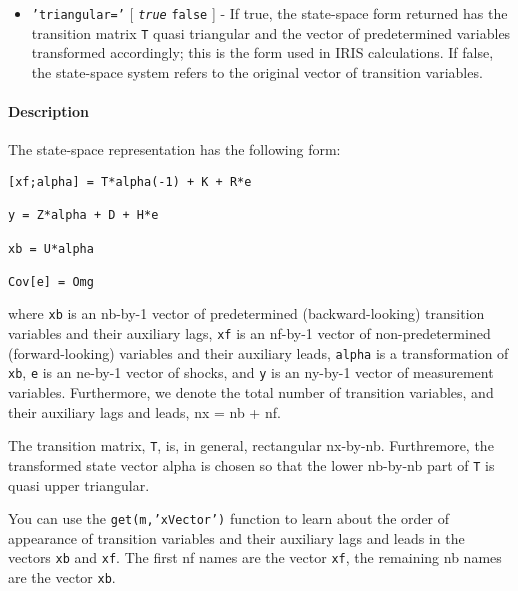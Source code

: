 \begin{itemize}
\itemsep1pt\parskip0pt
\item
  \texttt{'triangular='} {[} \emph{\texttt{true}} \textbar{}
  \texttt{false} {]} - If true, the state-space form returned has the
  transition matrix \texttt{T} quasi triangular and the vector of
  predetermined variables transformed accordingly; this is the form used
  in IRIS calculations. If false, the state-space system refers to the
  original vector of transition variables.
\end{itemize}

\paragraph{Description}\label{description}

The state-space representation has the following form:

\begin{verbatim}
[xf;alpha] = T*alpha(-1) + K + R*e

y = Z*alpha + D + H*e

xb = U*alpha

Cov[e] = Omg
\end{verbatim}

where \texttt{xb} is an nb-by-1 vector of predetermined
(backward-looking) transition variables and their auxiliary lags,
\texttt{xf} is an nf-by-1 vector of non-predetermined (forward-looking)
variables and their auxiliary leads, \texttt{alpha} is a transformation
of \texttt{xb}, \texttt{e} is an ne-by-1 vector of shocks, and
\texttt{y} is an ny-by-1 vector of measurement variables. Furthermore,
we denote the total number of transition variables, and their auxiliary
lags and leads, nx = nb + nf.

The transition matrix, \texttt{T}, is, in general, rectangular nx-by-nb.
Furthremore, the transformed state vector alpha is chosen so that the
lower nb-by-nb part of \texttt{T} is quasi upper triangular.

You can use the \texttt{get(m,'xVector')} function to learn about the
order of appearance of transition variables and their auxiliary lags and
leads in the vectors \texttt{xb} and \texttt{xf}. The first nf names are
the vector \texttt{xf}, the remaining nb names are the vector
\texttt{xb}.


